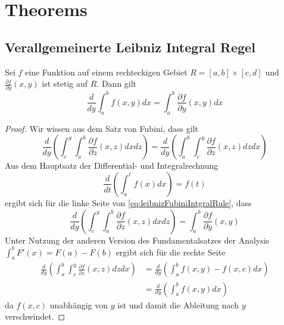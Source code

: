 \chapter{Theorems}
\section{Verallgemeinerte Leibniz Integral Regel}
\begin{theorem}
\label{thm:leibnizIntegralRule}
Sei $f$ eine Funktion auf einem rechteckigen Gebiet $R=[a,b]\times [c,d]$ und $\frac{\partial f}{\partial y}(x,y)$ ist stetig auf $R$. Dann gilt
\begin{equation}
 \frac{d}{dy}\int_a^b f(x,y)dx = \int_a^b \frac{\partial f}{\partial y}(x,y)dx
\end{equation}
\begin{proof}
 Wir wissen aus dem Satz von Fubini, dass gilt
 \begin{equation}
 \label{eq:leibnizFubiniIntgralRule}
  \frac{d}{dy}\left( \int_c^y \int_a^b \frac{\partial f}{\partial z}(x,z) dx dz\right) = 
  \frac{d}{dy}\left( \int_a^b \int_c^y \frac{\partial f}{\partial z}(x,z) dz dx\right) 
 \end{equation}
Aus dem Hauptsatz der Differential- und Integralrechnung 
\[
 \frac{d}{dt}\left( \int_a^t f(x)dx\right) = f(t)
\]
ergibt sich für die linke Seite von \eqref{eq:leibnizFubiniIntgralRule}, dass
\[
 \frac{d}{dy}\left( \int_c^y \int_a^b \frac{\partial f}{\partial z}(x,z) dx dz\right)= \int_a^b\frac{\partial f}{\partial y}(x,y)
\]
Unter Nutzung der anderen Version des Fundamentalsatzes der Analysis $\int_a^bF'(x) =F(a) - F(b)$ ergibt sich für die rechte Seite
\[
\begin{aligned}
  \frac{d}{dy}\left( \int_a^b \int_c^y \frac{\partial f}{\partial z}(x,z) dz dx\right) &= \frac{d}{dy} \left(\int_a^b f(x,y) - f(x,c)dx\right)\\
  &= \frac{d}{dy} \left(\int_a^b f(x,y)dx\right)
\end{aligned}
 \]
da $f(x,c)$ unabhängig von $y$ ist und damit die Ableitung nach $y$ verschwindet.
\end{proof}
\end{theorem}

